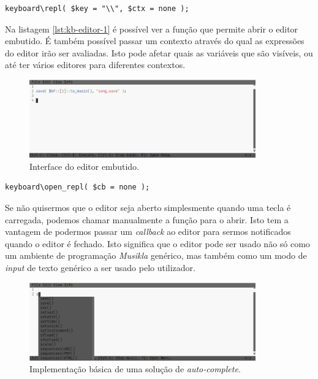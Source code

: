 \begin{lstlisting}[caption={Abre o editor quando a tecla \textbackslash{} é premida},label={lst:kb-editor-1}]
keyboard\repl( $key = "\\", $ctx = none );
\end{lstlisting}

Na listagem \ref{lst:kb-editor-1} é possível ver a função que permite abrir o editor embutido. É também possível passar um contexto através do qual as expressões do editor irão ser avaliadas. Isto pode afetar quais as variáveis que são visíveis, ou até ter vários editores para diferentes contextos.

\begin{figure}[h]
\begin{center}
    \includegraphics[width=0.87\textwidth]{img/embedded_editor.png}
\end{center}
\caption{Interface do editor embutido.}
\end{figure}

\begin{lstlisting}[caption={Abrir manualmente o editor},label={lst:kb-editor-2}]
keyboard\open_repl( $cb = none );
\end{lstlisting}

Se não quisermos que o editor seja aberto simplesmente quando uma tecla é carregada, podemos chamar manualmente a função para o abrir. Isto tem a vantagem de podermos passar um \textit{callback} ao editor para sermos notificados quando o editor é fechado. 
Isto significa que o editor pode ser usado não só como um ambiente de programação \textit{Musikla} genérico, mas também como um modo de \textit{input} de texto genérico a ser usado pelo utilizador.

\begin{figure}[h]
\begin{center}
    \includegraphics[width=0.87\textwidth]{img/embedded_editor_autocomplete.png}
\end{center}
\caption{Implementação básica de uma solução de \textit{auto-complete}.}
\end{figure}

